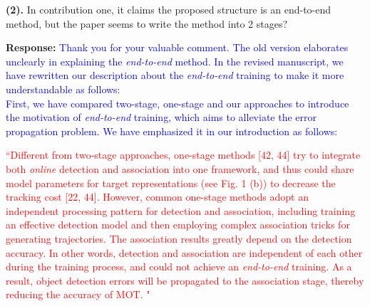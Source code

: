 \documentclass[12pt,journal,onecolumn]{IEEEtran}
\begin{document}
%

\textbf{(2).} In contribution one, it claims the proposed structure is an end-to-end method, but the paper seems to write the method into 2 stages?

\textbf{Response:} \textcolor{blue}{Thank you for your valuable comment. 
The old version elaborates unclearly in explaining the \emph{end-to-end} method.
In the revised manuscript, we have rewritten our description about the \emph{end-to-end} training to make it more understandable as follows: \\
First, we have compared two-stage, one-stage and our approaches to introduce the motivation of \emph{end-to-end} training, which aims to alleviate the error propagation problem.
We have emphasized it in our introduction as follows:
}

\textcolor{red}{
``Different from two-stage approaches, one-stage methods [42, 44] try to integrate both \emph{online} detection and association into one framework, and thus could share model parameters for target \textcolor{red}{representations (see Fig. 1 (b)) to} decrease the tracking cost [22, 44]. 
However, common one-stage methods adopt an independent processing pattern for detection and association,
including training an effective detection model and then employing complex association tricks for generating trajectories. 
The association results greatly depend on the detection accuracy.
In other words, detection and association are independent of each other during the training process, 
and could not achieve an \emph{end-to-end} training.
As a result, object detection errors will be propagated to the association stage, thereby reducing the accuracy of MOT. "
}
\end{document}

